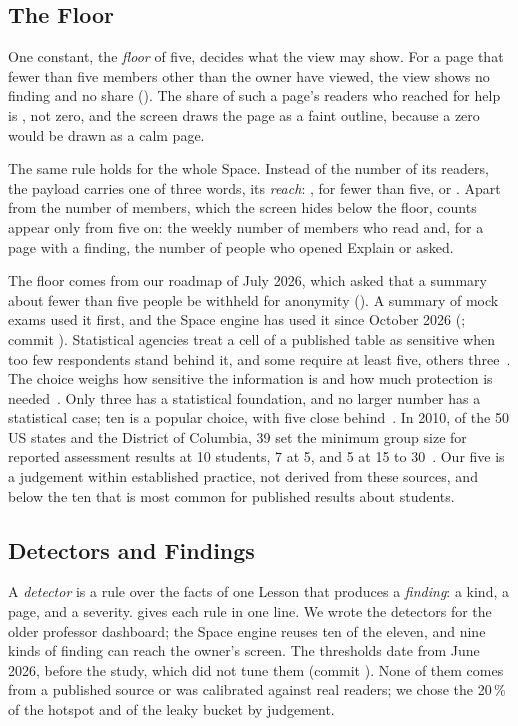 \subsection{The Floor}

One constant, the \emph{floor} of five, decides what the view may show. For a
page that fewer than five members other than the owner have viewed, the view
shows no finding and no share
(). The share of such a page's
readers who reached for help is , not zero, and the screen draws
the page as a faint outline, because a zero would be drawn as a calm page.

The same rule holds for the whole Space. Instead of the number of its readers,
the payload carries one of three words, its \emph{reach}: ,
 for fewer than five, or . Apart from the number of
members, which the screen hides below the floor, counts appear only from five
on: the weekly number of members who read and, for a page with a finding, the
number of people who opened Explain or asked.

The floor comes from our roadmap of July 2026, which asked that a summary
about fewer than five people be withheld for anonymity
(). A summary of mock exams used it
first, and the Space engine has used it since October 2026
(; commit ). Statistical agencies
treat a cell of a published table as sensitive when too few respondents stand
behind it, and some require at least five, others
three~\cites[15]{fcsm2005spwp22}[226]{hundepool2026handbook}. The choice
weighs how sensitive the information is and how much protection is
needed~\cite[15]{fcsm2005spwp22}. Only three has a statistical foundation, and no
larger number has a statistical case; ten is a popular choice, with five close
behind~\cite[109--110]{ritchie2022ten}. In 2010, of the 50 US states and the
District of Columbia, 39 set the minimum group size for reported assessment
results at 10 students, 7 at 5, and 5 at 15 to 30~\cite[7]{seastrom2010nces}.
Our five is a judgement within established practice, not derived from these
sources, and below the ten that is most common for published results about
students.

\subsection{Detectors and Findings}

A \emph{detector} is a rule over the facts of one Lesson that produces a
\emph{finding}: a kind, a page, and a severity.  gives
each rule in one line. We wrote the detectors for the older professor
dashboard; the Space engine reuses ten of the eleven, and nine kinds of
finding can reach the owner's screen. The thresholds date from June 2026,
before the study, which did not tune them (commit ). None of them
comes from a published source or was calibrated against real readers; we
chose the 20\,\% of the hotspot and of the leaky bucket by judgement.

